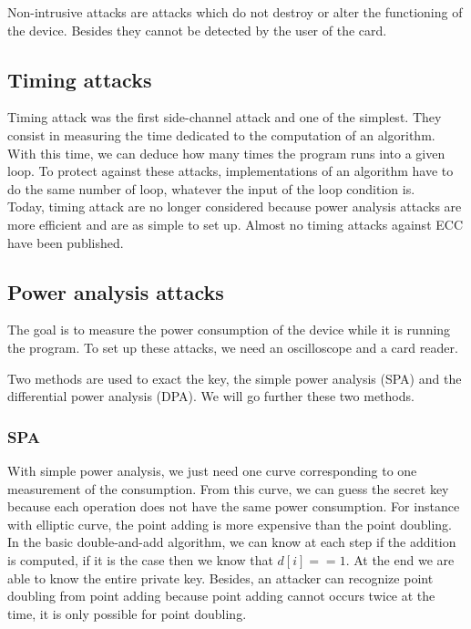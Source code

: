 \documentclass[journal]{IEEEtran}
\begin{document}
Non-intrusive attacks are attacks which do not destroy or alter the functioning of the device. Besides they cannot be detected by the user of the card. 
   
    \subsection{Timing attacks}

Timing attack was the first side-channel attack and one of the simplest. They consist in measuring the time dedicated to the computation of an algorithm. With this time, we can deduce how many times the program runs into a given loop.
To protect against these attacks, implementations of an algorithm have to do the same number of loop, whatever the input of the loop condition is. \\

Today, timing attack are no longer considered because power analysis attacks are more efficient and are as simple to set up. Almost no timing attacks against ECC have been published.

    \subsection{Power analysis attacks}

The goal is to measure the power consumption of the device while it is running the program. To set up these attacks, we need an oscilloscope and a card reader.

Two methods are used to exact the key, the simple power analysis (SPA) and the differential power analysis (DPA). We will go further these two methods.

        \subsubsection{SPA}

With simple power analysis, we just need one curve corresponding to one measurement of the consumption. From this curve, we can guess the secret key because each operation does not have the same power consumption. For instance with elliptic curve, the point adding is more expensive than the point doubling. In the basic double-and-add algorithm, we can know at each step if the addition is computed, if it is the case then we know that $ d[i]==1 $. At the end we are able to know the entire private key. Besides, an attacker can recognize point doubling from point adding because point adding cannot occurs twice at the time, it is only possible for point doubling.\\
\end{document}
